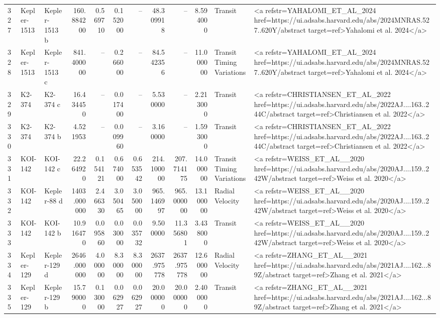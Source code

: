 \begin{tabular}{lllrrrrrrrll}
327 & Kepler-1513 & Kepler-1513 b & 160.884200 & 0.569710 & 0.152000 & -- & 48.309918 & -- & 8.594000 & Transit & <a refstr=YAHALOMI_ET_AL_2024 href=https://ui.adsabs.harvard.edu/abs/2024MNRAS.527..620Y/abstract target=ref>Yahalomi et al. 2024</a> \\
328 & Kepler-1513 & Kepler-1513 c & 841.400000 & -- & 0.266000 & -- & 84.542356 & -- & 11.000000 & Transit Timing Variations & <a refstr=YAHALOMI_ET_AL_2024 href=https://ui.adsabs.harvard.edu/abs/2024MNRAS.527..620Y/abstract target=ref>Yahalomi et al. 2024</a> \\
329 & K2-374 & K2-374 c & 16.434450 & -- & 0.017400 & -- & 5.530000 & -- & 2.213000 & Transit & <a refstr=CHRISTIANSEN_ET_AL_2022 href=https://ui.adsabs.harvard.edu/abs/2022AJ....163..244C/abstract target=ref>Christiansen et al. 2022</a> \\
330 & K2-374 & K2-374 b & 4.521953 & -- & 0.009960 & -- & 3.160000 & -- & 1.593000 & Transit & <a refstr=CHRISTIANSEN_ET_AL_2022 href=https://ui.adsabs.harvard.edu/abs/2022AJ....163..244C/abstract target=ref>Christiansen et al. 2022</a> \\
331 & KOI-142 & KOI-142 c & 22.264920 & 0.154121 & 0.674000 & 0.653542 & 214.100000 & 207.714175 & 14.000000 & Transit Timing Variations & <a refstr=WEISS_ET_AL__2020 href=https://ui.adsabs.harvard.edu/abs/2020AJ....159..242W/abstract target=ref>Weiss et al. 2020</a> \\
332 & KOI-142 & Kepler-88 d & 1403.000000 & 2.466330 & 3.050465 & 3.050000 & 965.146997 & 965.000000 & 13.100000 & Radial Velocity & <a refstr=WEISS_ET_AL__2020 href=https://ui.adsabs.harvard.edu/abs/2020AJ....159..242W/abstract target=ref>Weiss et al. 2020</a> \\
333 & KOI-142 & KOI-142 b & 10.916470 & 0.095860 & 0.030000 & 0.035732 & 9.500000 & 11.356801 & 3.438000 & Transit & <a refstr=WEISS_ET_AL__2020 href=https://ui.adsabs.harvard.edu/abs/2020AJ....159..242W/abstract target=ref>Weiss et al. 2020</a> \\
334 & Kepler-129 & Kepler-129 d & 2646.000000 & 4.000000 & 8.300000 & 8.300000 & 2637.975778 & 2637.975778 & 12.600000 & Radial Velocity & <a refstr=ZHANG_ET_AL__2021 href=https://ui.adsabs.harvard.edu/abs/2021AJ....162...89Z/abstract target=ref>Zhang et al. 2021</a> \\
335 & Kepler-129 & Kepler-129 b & 15.790000 & 0.130000 & 0.062927 & 0.062927 & 20.000000 & 20.000000 & 2.400000 & Transit & <a refstr=ZHANG_ET_AL__2021 href=https://ui.adsabs.harvard.edu/abs/2021AJ....162...89Z/abstract target=ref>Zhang et al. 2021</a> \\

\end{tabular}
